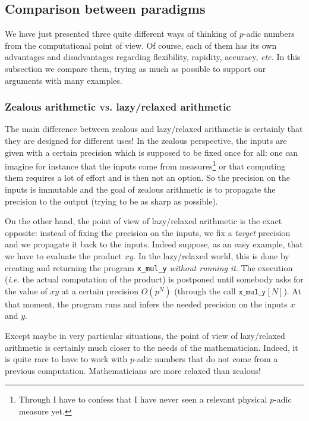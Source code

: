 \documentclass[11pt]{article}
\numberwithin{equation}{section}
\numberwithin{figure}{section}
\theoremstyle{definition}
\begin{document}
\subsection{Comparison between paradigms}
\label{ssec:compparadigm}

We have just presented three quite different ways of thinking of
$p$-adic numbers from the computational point of view. Of course, 
each of them has its own advantages and disadvantages regarding
flexibility, rapidity, accuracy, \emph{etc.}
In this subsection we compare them, trying as much as possible to
support our arguments with many examples.

\subsubsection{Zealous arithmetic \textsc{vs.} lazy/relaxed arithmetic}
\label{sssec:zealousVSrelaxed}

The main difference between zealous and lazy/relaxed arithmetic is
certainly that they are designed for different uses! In the zealous
perspective, the inputs are given with a certain precision which is
supposed to be fixed once for all: one can imagine for instance that
the inputs come from measures\footnote{Through I have to confess that
I have never seen a relevant physical $p$-adic measure yet.} or that
computing them requires a lot of effort and is then not an option.
So the precision on the inputs is immutable and the goal of zealous
arithmetic is to propagate the precision to the output (trying to
be as sharp as possible).

On the other hand, the point of view of lazy/relaxed arithmetic is the 
exact opposite: instead of fixing the precision on the inputs, we fix a 
\emph{target} precision and we propagate it back to the inputs. Indeed 
suppose, as an easy example, that we have to evaluate the product $xy$. In 
the lazy/relaxed world, this is done by creating and returning the 
program \texttt{x\_mul\_y} \emph{without running it}.
The execution (\emph{i.e.} the actual computation of the product) is 
postponed until somebody asks for the value of $xy$ at a certain 
precision $O(p^N)$ (through the call $\texttt{x\_mul\_y}[N]$). At that 
moment, the program runs and infers the needed precision on the inputs 
$x$ and $y$.

Except maybe in very particular situations, the point of view of 
lazy/relaxed arithmetic is certainly much closer to the needs of the 
mathematician. Indeed, it is quite rare to have to work with $p$-adic
numbers that do not come from a previous computation. Mathematicians
are more relaxed than zealous!
\end{document}
